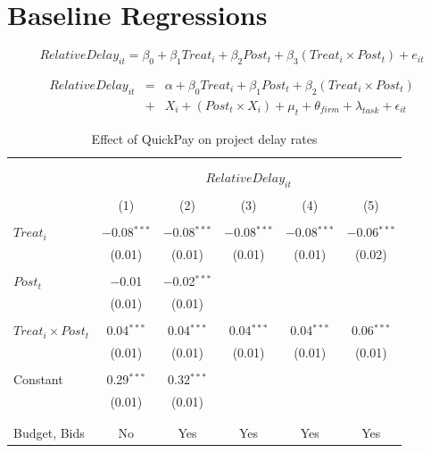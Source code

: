 \documentclass[
]{article}
\begin{document}
\hypertarget{baseline-regressions}{%
\section{Baseline Regressions}\label{baseline-regressions}}

\[ RelativeDelay_{it} = \beta_0 + \beta_1 Treat_i + \beta_2 Post_t + \beta_3 (Treat_i \times Post_t) + e_{it}\]

\[ \begin{aligned} RelativeDelay_{it} &=& \alpha+\beta_0 Treat_i + \beta_1 Post_t + \beta_2 (Treat_i \times Post_t)\\
&+&  X_i + (Post_t \times X_i) + \mu_t + \theta_{firm} + \lambda_{task}+ \epsilon_{it}
\end{aligned}\]

\begin{table}[H] \centering 
  \caption{Effect of QuickPay on project delay rates} 
  \label{} 
\small 
\begin{tabular}{@{\extracolsep{-2pt}}lccccc} 
\\[-1.8ex]\hline 
\hline \\[-1.8ex] 
\\[-1.8ex] & \multicolumn{5}{c}{$RelativeDelay_{it}$} \\ 
\\[-1.8ex] & (1) & (2) & (3) & (4) & (5)\\ 
\hline \\[-1.8ex] 
 $Treat_i$ & $-$0.08$^{***}$ & $-$0.08$^{***}$ & $-$0.08$^{***}$ & $-$0.08$^{***}$ & $-$0.06$^{***}$ \\ 
  & (0.01) & (0.01) & (0.01) & (0.01) & (0.02) \\ 
  & & & & & \\ 
 $Post_t$ & $-$0.01 & $-$0.02$^{***}$ &  &  &  \\ 
  & (0.01) & (0.01) &  &  &  \\ 
  & & & & & \\ 
 $Treat_i \times Post_t$ & 0.04$^{***}$ & 0.04$^{***}$ & 0.04$^{***}$ & 0.04$^{***}$ & 0.06$^{***}$ \\ 
  & (0.01) & (0.01) & (0.01) & (0.01) & (0.01) \\ 
  & & & & & \\ 
 Constant & 0.29$^{***}$ & 0.32$^{***}$ &  &  &  \\ 
  & (0.01) & (0.01) &  &  &  \\ 
  & & & & & \\ 
\hline \\[-1.8ex] 
Budget, Bids & No & Yes & Yes & Yes & Yes \\ 

\end{tabular}
\end{table}
\end{document}
